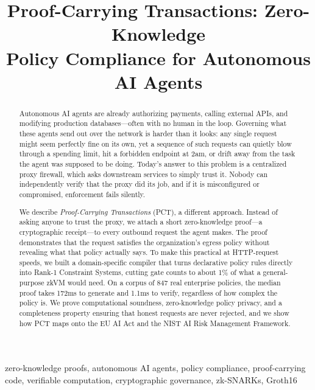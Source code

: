 \documentclass[10pt,conference]{IEEEtran}
\begin{document}
\title{Proof-Carrying Transactions: Zero-Knowledge\\Policy Compliance for Autonomous AI Agents}

\author{}

\maketitle

\begin{abstract}
Autonomous AI agents are already authorizing payments, calling external APIs, and modifying production databases---often with no human in the loop. Governing what these agents send out over the network is harder than it looks: any single request might seem perfectly fine on its own, yet a sequence of such requests can quietly blow through a spending limit, hit a forbidden endpoint at 2am, or drift away from the task the agent was supposed to be doing. Today's answer to this problem is a centralized proxy firewall, which asks downstream services to simply trust it. Nobody can independently verify that the proxy did its job, and if it is misconfigured or compromised, enforcement fails silently.

We describe \emph{Proof-Carrying Transactions} (PCT), a different approach. Instead of asking anyone to trust the proxy, we attach a short zero-knowledge proof---a cryptographic receipt---to every outbound request the agent makes. The proof demonstrates that the request satisfies the organization's egress policy without revealing what that policy actually says. To make this practical at HTTP-request speeds, we built a domain-specific compiler that turns declarative policy rules directly into Rank-1 Constraint Systems, cutting gate counts to about 1\% of what a general-purpose zkVM would need. On a corpus of 847 real enterprise policies, the median proof takes 172ms to generate and 1.1ms to verify, regardless of how complex the policy is. We prove computational soundness, zero-knowledge policy privacy, and a completeness property ensuring that honest requests are never rejected, and we show how PCT maps onto the EU AI Act and the NIST AI Risk Management Framework.
\end{abstract}

\begin{IEEEkeywords}
zero-knowledge proofs, autonomous AI agents, policy compliance, proof-carrying code, verifiable computation, cryptographic governance, zk-SNARKs, Groth16
\end{IEEEkeywords}
\end{document}
